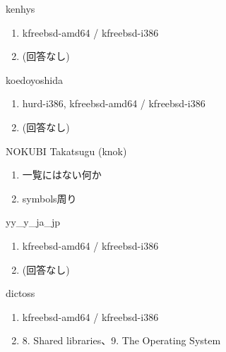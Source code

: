 \begin{prework}{ kenhys }
  \begin{enumerate}
  \item kfreebsd-amd64 / kfreebsd-i386
  \item (回答なし)
  \end{enumerate}
\end{prework}

\begin{prework}{ koedoyoshida }
  \begin{enumerate}
  \item hurd-i386, kfreebsd-amd64 / kfreebsd-i386
  \item (回答なし)
  \end{enumerate}
\end{prework}

\begin{prework}{ NOKUBI Takatsugu (knok) }
  \begin{enumerate}
  \item 一覧にはない何か
  \item symbols周り
  \end{enumerate}
\end{prework}

\begin{prework}{ yy\_y\_ja\_jp }
  \begin{enumerate}
  \item kfreebsd-amd64 / kfreebsd-i386
  \item (回答なし)
  \end{enumerate}
\end{prework}

\begin{prework}{ dictoss }
  \begin{enumerate}
  \item kfreebsd-amd64 / kfreebsd-i386
  \item 8. Shared libraries、9. The Operating System
  \end{enumerate}
\end{prework}
